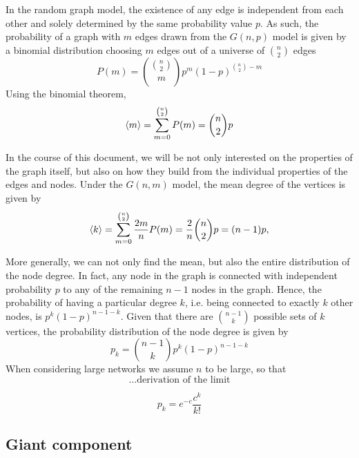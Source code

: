 In the random graph model, the existence of any edge is independent from each other and solely determined by the same probability value $p$.
As such, the probability of a graph with $m$ edges drawn from the $G(n,p)$ model is given by a binomial distribution choosing $m$ edges out of a universe of $\binom{n}{2}$ edges
\begin{equation}
	P(m) = \binom{\binom{n}{2}}{m} p^m (1-p)^{\binom{n}{2}-m}
\end{equation}
Using the binomial theorem, 
\begin{equation}
	\left< m \right> = \sum^{\binom{n}{2}}_{m=0} P(m) = \binom{n}{2} p
\end{equation}

In the course of this document, we will be not only interested on the properties of the graph itself, but also on how they build from the individual properties of the edges and nodes.
Under the $G(n,m)$ model, the mean degree of the vertices is given by
\begin{equation}
	\left< k \right> = \sum^{\binom{n}{2}}_{m=0} \frac{2m}{n} P(m) = \frac{2}{n} \binom{n}{2} p = (n-1) p,
\end{equation}

More generally, we can not only find the mean, but also the entire distribution of the node degree.
In fact, any node in the graph is connected with independent probability $p$ to any of the remaining $n-1$ nodes in the graph.
Hence, the probability of having a particular degree $k$, i.e. being connected to exactly $k$ other nodes, is $p^k (1-p)^{n-1-k}$.
Given that there are $\binom{n-1}{k}$ possible sets of $k$ vertices, the probability distribution of the node degree is given by
\begin{equation}
	p_k = \binom{n-1}{k} p^k (1-p)^{n-1-k}
\end{equation}
When considering large networks we assume $n$ to be large, so that 
$$\ldots   \textrm{derivation of the limit}$$

\begin{equation}
	p_k = e^{-c} \frac{c^k}{k!}
\end{equation}






\subsection{Giant component} %
\label{sub:giant_component}

